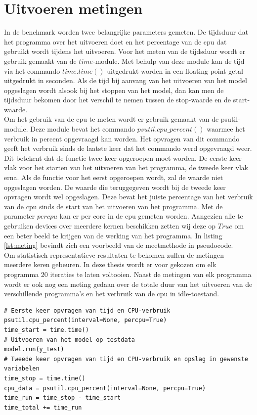 \section{Uitvoeren metingen}
In de benchmark worden twee belangrijke parameters gemeten. De tijdsduur dat het programma over het uitvoeren doet en het percentage van de \gls{cpu} dat gebruikt wordt tijdens het uitvoeren. Voor het meten van de tijdsduur wordt er gebruik gemaakt van de $time$-module. Met behulp van deze module kan de tijd via het commando $time.time()$ uitgedrukt worden in een floating point getal uitgedrukt in seconden. Als de tijd bij aanvang van het uitvoeren van het model opgeslagen wordt alsook bij het stoppen van het model, dan kan men de tijdsduur bekomen door het verschil te nemen tussen de stop-waarde en de start-waarde.\\
Om het gebruik van de \gls{cpu} te meten wordt er gebruik gemaakt van de psutil-module. Deze module bevat het commando $psutil.cpu\_percent()$ waarmee het verbruik in percent opgevraagd kan worden. Het opvragen van dit commando geeft het verbruik sinds de laatste keer dat het commando werd opgevraagd weer. Dit betekent dat de functie twee keer opgeroepen moet worden. De eerste keer vlak voor het starten van het uitvoeren van het programma, de tweede keer vlak erna. Als de functie voor het eerst opgeroepen wordt, zal de waarde niet opgeslagen worden. De waarde die teruggegeven wordt bij de tweede keer opvragen wordt wel opgeslagen. Deze bevat het juiste percentage van het verbruik van de \gls{cpu} sinds de start van het uitvoeren van het programma. Met de parameter $percpu$ kan er per core in de \gls{cpu} gemeten worden. Aangezien alle te gebruiken devices over meerdere kernen beschikken zetten wij deze op $True$ om een beter beeld te krijgen van de werking van het programma. In listing \ref{lst:meting} bevindt zich een voorbeeld van de meetmethode in pseudocode.\\
Om statistisch representatieve resultaten te bekomen zullen de metingen meerdere keren gebeuren. In deze thesis wordt er voor gekozen om elk programma 20 iteraties te laten voltooien. Naast de metingen van elk programma wordt er ook nog een meting gedaan over de totale duur van het uitvoeren van de verschillende programma's en het verbruik van de \gls{cpu} in idle-toestand.


\begin{lstlisting}[caption={Meten van gewenste data.}, captionpos=b,label={lst:meting}]
# Eerste keer opvragen van tijd en CPU-verbruik
psutil.cpu_percent(interval=None, percpu=True)
time_start = time.time()
# Uitvoeren van het model op testdata
model.run(y_test)
# Tweede keer opvragen van tijd en CPU-verbruik en opslag in gewenste variabelen
time_stop = time.time()
cpu_data = psutil.cpu_percent(interval=None, percpu=True)
time_run = time_stop - time_start
time_total += time_run
\end{lstlisting}

